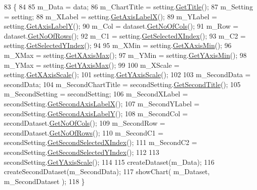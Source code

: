 \begin{DoxyCode}
83                                           \{
84     
85         m\_Data = data;
86         m\_ChartTitle = setting.\hyperlink{class_data_attribute_ade9747a192ba22fe1020e874bff6a48c}{GetTitle}();
87         m\_Setting = setting;
88         m\_XLabel = setting.\hyperlink{class_data_attribute_aecb451704a87d77dd80dbad8a19099d1}{GetAxisLabelX}();
89         m\_YLabel = setting.\hyperlink{class_data_attribute_af5f68794cd0195d42135d5e48120ccc0}{GetAxisLabelY}();
90         m\_Col = dataset.\hyperlink{class_dataset_ab922bef50c8aa1531de8704731779246}{GetNoOfCols}();
91         m\_Row = dataset.\hyperlink{class_dataset_a91257a605317576e87e1c32e54739e51}{GetNoOfRows}();
92         m\_C1 = setting.\hyperlink{class_data_attribute_a0f4a54973bc44b0526f78bda945dc81b}{GetSelectedXIndex}();
93         m\_C2 = setting.\hyperlink{class_data_attribute_a82e7519853d9f470ea183dd0c39a03d6}{GetSelectedYIndex}();
94         
95         m\_XMin = setting.\hyperlink{class_data_attribute_afa9da883abc4abad5f64c045de114c50}{GetXAxisMin}();
96         m\_XMax = setting.\hyperlink{class_data_attribute_ada370712422c7cbd21b7be4a0d88caf7}{GetXAxisMax}();
97         m\_YMin = setting.\hyperlink{class_data_attribute_af0786b4de674874c0bb8ca9dbe1519c6}{GetYAxisMin}();
98         m\_YMax = setting.\hyperlink{class_data_attribute_a81243eb8f7008e05e74b0f3571d2f08d}{GetYAxisMax}();
99         
100         m\_XScale = setting.\hyperlink{class_data_attribute_a5a1de25600487aa958a19ce01151fea4}{GetXAxisScale}();
101         setting.\hyperlink{class_data_attribute_a95259727ce91efc0e0eaa28487d944c5}{GetYAxisScale}();
102         
103         m\_SecondData = secondData;
104         m\_SecondChartTitle = secondSetting.\hyperlink{class_data_attribute_a4079522c93025fce7569eaed585f4aeb}{GetSecondTitle}();
105         m\_SecondSetting = secondSetting;
106         m\_SecondXLabel = secondSetting.\hyperlink{class_data_attribute_a8ace4cb1fee9e2abeabe3efc9a190c8f}{GetSecondAxisLabelX}();
107         m\_SecondYLabel = secondSetting.\hyperlink{class_data_attribute_a6efb7e067317898feefbbf6bd472b998}{GetSecondAxisLabelY}();
108         m\_SecondCol = secondDataset.\hyperlink{class_dataset_ab922bef50c8aa1531de8704731779246}{GetNoOfCols}();
109         m\_SecondRow = secondDataset.\hyperlink{class_dataset_a91257a605317576e87e1c32e54739e51}{GetNoOfRows}();
110         m\_SecondC1 = secondSetting.\hyperlink{class_data_attribute_a7f501790eee650ddf9ac17c4f63a3995}{GetSecondSelectedXIndex}();
111         m\_SecondC2 = secondSetting.\hyperlink{class_data_attribute_a6f61ad05915f4aa31ad3dba00596da64}{GetSecondSelectedYIndex}();
112 
113         secondSetting.\hyperlink{class_data_attribute_a95259727ce91efc0e0eaa28487d944c5}{GetYAxisScale}();
114         
115         createDataset(m\_Data);
116         createSecondDataset(m\_SecondData);
117         showChart( m\_Dataset, m\_SecondDataset );
118     \} 
\end{DoxyCode}
